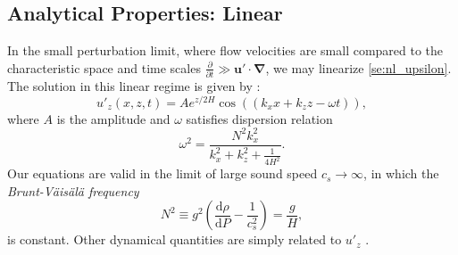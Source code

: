 \documentclass[
        fleqn,
        usenatbib,
    ]{mnras}
\newcommand*{\rd}[2]{\frac{\mathrm{d}#1}{\mathrm{d}#2}}
\newcommand*{\pd}[2]{\frac{\partial#1}{\partial#2}}
\newcommand*{\p}[1]{\left(#1\right)}
\newcommand*{\bm}[1]{\boldsymbol{\mathbf{#1}}}
\begin{document}
\subsection{Analytical Properties: Linear}

In the small perturbation limit, where flow velocities are small compared to the
characteristic space and time scales $\pd{}{t} \gg \bm{u}' \cdot
\bm{\nabla}$, we may linearize \autoref{se:nl_upsilon}. The solution in this
linear regime is given by \citep{drazin,sutherland0}:
\begin{equation}
    u'_z\p{x, z, t} = Ae^{z/2H}\cos\p{\p{k_{x}x + k_{z}z - \omega t}},
        \label{eq:k0z_sign}
\end{equation}
where $A$ is the amplitude and $\omega$ satisfies dispersion relation
\begin{equation}
    \omega^2 = \frac{N^2k_{x}^2}{k_{x}^2 + k_{z}^2 + \frac{1}{4H^2}}.
        \label{eq:disp_rel}
\end{equation}
Our equations are valid in the limit of large sound speed $c_s \to \infty$, in
which the \emph{Brunt-V\"ais\"al\"a frequency}
\begin{equation}
    N^2 \equiv g^2\p{\rd{\rho}{P} - \frac{1}{c_s^2}} = \frac{g}{H},
\end{equation}
is constant. Other dynamical quantities are simply related to $u'_z$ \citep[see
e.g.][]{sutherland0}.
\end{document}
